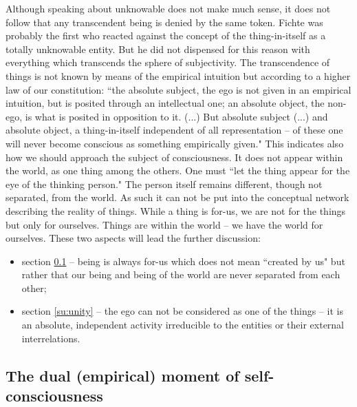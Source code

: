 Although speaking about unknowable does not make much sense, it does not follow that any transcendent being 
is denied by the same token. Fichte was probably the first who reacted against the concept of the thing-in-itself as 
a totally unknowable entity. But he did not dispensed for this reason with everything which transcends the sphere 
of subjectivity. The transcendence of things is not known by means of the empirical intuition but according to a 
higher law of our constitution: ``the absolute subject, the ego is not given in an empirical intuition, but is posited 
through an intellectual one; an absolute object, the non-ego, is what is posited in opposition to it. (...) But 
absolute subject (...) and absolute object, a thing-in-itself independent of all representation -- of these one will never 
become conscious as something empirically given." \cite{RoA}  This indicates also how we should approach the subject of 
consciousness. It does not appear within the world, as one thing among the others. One must ``let the thing appear 
for the eye of the thinking person." \cite{ITS}  The person itself remains different, though not separated, from the world. As 
such it can not be put into the conceptual network describing the reality of things. While a thing is for-us, we are 
not for the things but only for ourselves. Things are within the world -- we have the world for ourselves. These two 
aspects will lead the further discussion:
\begin{itemize}
\item section \ref{su:dual} -- being is always for-us which does not mean ``created by us" but rather that our being and being 
of the world are never separated from each other;
\item section \ref{su:unity} -- the ego can not be considered as one of the things -- it is an absolute, independent activity 
irreducible to the entities or their external interrelations.
\end{itemize}

\subsection{The dual (empirical) moment of self-consciousness}\label{su:dual}


